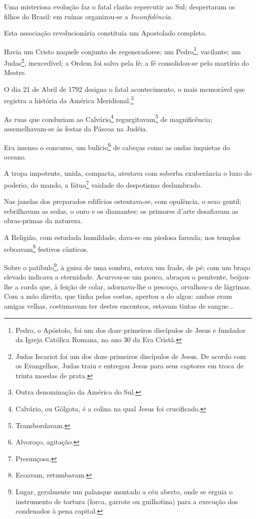 {Uma misteriosa evolução faz o fatal clarão repercutir ao Sul;
despertaram os filhos do Brasil: em ruínas organizou-se a
\emph{Inconfidência}.

Esta associação revolucionária constituía um Apostolado completo.

Havia um Cristo naquele conjunto de regeneradores; um Pedro\footnote{
  Pedro, o Apóstolo, foi um dos doze primeiros discípulos de Jesus e
  fundador da Igreja Católica Romana, no ano 30 da Era Cristã.},
vacilante; um Judas\footnote{Judas Iscariot foi um dos doze primeiros
  discípulos de Jesus. De acordo com os Evangelhos, Judas traiu e
  entregou Jesus para seus captores em troca de trinta moedas de prata.},
inexcedível; a Ordem foi salva pela fé; a fé consolidou-se pelo martírio
do Mestre.

O dia 21 de Abril de 1792 designa o fatal acontecimento, o mais
memorável que registra a história da América Meridional.\footnote{
  Outra denominação da América do Sul.}

As ruas que conduziam ao Calvário\footnote{Calvário, ou Gólgota, é a
  colina na qual Jesus foi crucificado.} regurgitavam\footnote{
  Transbordavam.} de magnificência; assemelhavam-se às festas da Páscoa
na Judéia.

Era imenso o concurso, um bulício\footnote{Alvoroço, agitação.} de
cabeças como as ondas inquietas do oceano.

A tropa impotente, unida, compacta, atestava com soberba exuberância o
luxo do poderio, do mando, a fátua\footnote{Presunçosa.} vaidade do
despotismo deslumbrado.

Nas janelas dos preparados edifícios ostentava-se, com opulência, o sexo
gentil; rebrilhavam as sedas, o ouro e os diamantes: os primores d'arte
desafiavam as obras-primas da natureza.

A Religião, com estudada humildade, dava-se em piedosa farsada; nos
templos reboavam\footnote{Ecoavam, retumbavam.} festivos cânticos.

Sobre o patíbulo\footnote{Lugar, geralmente um palanque montado a céu
  aberto, onde se erguia o instrumento de tortura (forca, garrote ou
  guilhotina) para a execução dos condenados à pena capital.}, à guisa
de uma sombra, estava um frade, de pé; com um braço elevado indicava a
eternidade. Acurvou-se um pouco, abraçou o penitente, beijou-lhe a corda
que, à feição de colar, adornava-lhe o pescoço, orvalhou-a de lágrimas.
Com a mão direita, que tinha pelas costas, apertou a do algoz: ambas
eram amigas velhas, costumavam ter destes encontros, estavam tintas de
sangue...

}
